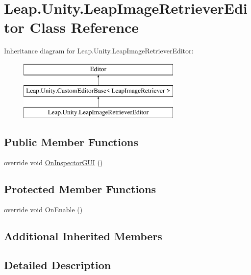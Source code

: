 \hypertarget{class_leap_1_1_unity_1_1_leap_image_retriever_editor}{}\section{Leap.\+Unity.\+Leap\+Image\+Retriever\+Editor Class Reference}
\label{class_leap_1_1_unity_1_1_leap_image_retriever_editor}
Inheritance diagram for Leap.\+Unity.\+Leap\+Image\+Retriever\+Editor\+:\begin{figure}[H]
\begin{center}
\leavevmode
\includegraphics[height=3.000000cm]{class_leap_1_1_unity_1_1_leap_image_retriever_editor}
\end{center}
\end{figure}
\subsection*{Public Member Functions}
\begin{DoxyCompactItemize}
\item 
override void \mbox{\hyperlink{class_leap_1_1_unity_1_1_leap_image_retriever_editor_a97415df441592589b7fec378bc15dea3}{On\+Inspector\+G\+UI}} ()
\end{DoxyCompactItemize}
\subsection*{Protected Member Functions}
\begin{DoxyCompactItemize}
\item 
override void \mbox{\hyperlink{class_leap_1_1_unity_1_1_leap_image_retriever_editor_a4219c7044bd7415bd98b7cd697335ab6}{On\+Enable}} ()
\end{DoxyCompactItemize}
\subsection*{Additional Inherited Members}


\subsection{Detailed Description}


